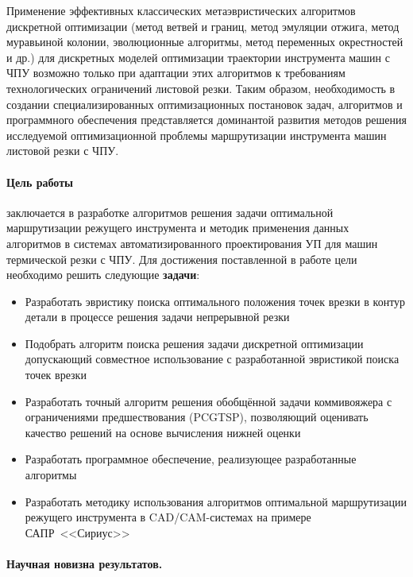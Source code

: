 \documentclass[14pt]{extarticle}
\begin{document}
Применение эффективных классических метаэвристических алгоритмов дискретной оптимизации 
(метод ветвей и границ, метод эмуляции отжига, метод муравьиной колонии, эволюционные алгоритмы, метод переменных окрестностей и др.) 
для дискретных моделей оптимизации траектории инструмента машин с ЧПУ 
возможно только при адаптации этих алгоритмов к требованиям технологических ограничений листовой резки.
Таким образом, 
необходимость в создании специализированных оптимизационных постановок задач, 
алгоритмов и программного обеспечения представляется 
доминантой развития методов решения исследуемой оптимизационной проблемы 
маршрутизации инструмента машин листовой резки с ЧПУ.

\paragraph*{Цель работы}
заключается в разработке алгоритмов решения задачи оптимальной
маршрутизации режущего инструмента 
и методик применения данных алгоритмов
в системах автоматизированного проектирования УП для машин термической резки с ЧПУ.
Для достижения поставленной в работе цели необходимо решить следующие 
{\bf задачи}:

\begin{itemize}
    \item 
    Разработать эвристику поиска оптимального положения
    точек врезки в контур детали в процессе решения задачи
    непрерывной резки
    \item 
    Подобрать алгоритм поиска решения задачи дискретной оптимизации
    допускающий совместное использование
    с разработанной эвристикой поиска точек врезки
    \item
    Разработать точный алгоритм решения 
    обобщённой задачи коммивояжера
    с ограничениями предшествования (PCGTSP),
    позволяющий оценивать качество решений
    на основе вычисления нижней оценки
    \item 
    Разработать программное обеспечение,
    реализующее разработанные алгоритмы
    \item 
    Разработать методику использования алгоритмов 
    оптимальной маршрутизации режущего инструмента
    в CAD/CAM-системах на примере САПР~<<Сириус>>
\end{itemize}

\paragraph*{Научная новизна результатов.}
\end{document}
